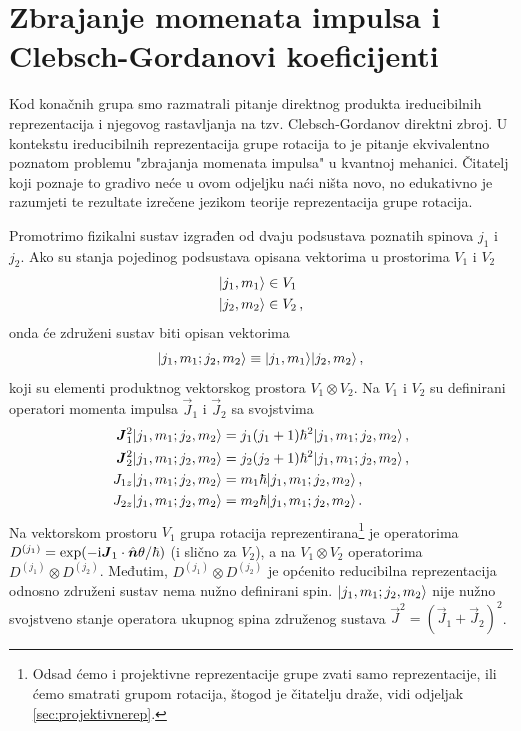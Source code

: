 \section{Zbrajanje momenata impulsa i Clebsch-Gor\-da\-no\-vi koeficijenti}
\label{sec:zbrajanjeJ}

Kod konačnih grupa smo razmatrali pitanje direktnog produkta
ireducibilnih reprezentacija i njegovog rastavljanja na tzv.
Clebsch-Gordanov direktni zbroj. U kontekstu ireducibilnih
reprezentacija grupe rotacija to je pitanje ekvivalentno
poznatom problemu "zbrajanja momenata impulsa" u kvantnoj
mehanici. Čitatelj koji poznaje to gradivo neće u ovom
odjeljku naći ništa novo, no edukativno je razumjeti te
rezultate izrečene jezikom teorije reprezentacija grupe rotacija.

Promotrimo fizikalni sustav izgrađen od dvaju podsustava poznatih
spinova $j_1$ i $j_2$. 
Ako su stanja pojedinog podsustava opisana vektorima u
prostorima $V_1$ i $V_2$
\begin{align}
| j_1, m_1 \rangle &\in V_1\\
| j_2, m_2 \rangle &\in V_2\,,
\end{align}
onda će združeni sustav biti opisan vektorima
\begin{equation}
    | j_1, m_1; j_2, m_2 \rangle \equiv| j_1, m_1 \rangle| j_2, m_2 \rangle \,,
\end{equation}
koji su elementi produktnog vektorskog prostora $V_1\otimes V_2$.
Na $V_1$ i $V_2$ su definirani operatori momenta impulsa
$\vec{J}_1$ i $\vec{J}_2$ sa svojstvima
\begin{align}
\vec{J}_{1}^2 \ket{j_1, m_1; j_2, m_2} &= j_1(j_1+1)\hbar^2 
  \ket{j_1, m_1; j_2, m_2}\,, \\
\vec{J}_{2}^2 \ket{j_1, m_1; j_2, m_2} &= j_2(j_2+1)\hbar^2 
  \ket{j_1, m_1; j_2, m_2}\,, \\
J_{1z}\ket{j_1, m_1; j_2, m_2} &= m_1 \hbar \ket{j_1, m_1; j_2, m_2}\,,\\
J_{2z}\ket{j_1, m_1; j_2, m_2} &= m_2 \hbar \ket{j_1, m_1; j_2, m_2}\,.
\end{align}
Na vektorskom
prostoru $V_1$ grupa rotacija reprezentirana\footnote{Odsad ćemo i projektivne reprezentacije
    grupe  zvati samo reprezentacije, ili ćemo  smatrati grupom rotacija,
štogod je čitatelju draže, vidi odjeljak \ref{sec:projektivnerep}.}
je operatorima $D^{(j_1)}=
\exp(-\rmi\vec{J}_1\cdot\hat{\vec{n}}\theta/\hbar)$ (i slično za $V_2$),
a na $V_1\otimes V_2$ operatorima
$D^{(j_1)}\otimes D^{(j_2)}$.
Međutim, $D^{(j_1)}\otimes D^{(j_2)}$ je općenito reducibilna reprezentacija
odnosno združeni sustav nema nužno definirani spin. 
$| j_1, m_1; j_2, m_2 \rangle$ nije nužno svojstveno
stanje operatora ukupnog spina združenog sustava $\vec{J}^2 = (\vec{J}_1 + \vec{J}_2)^2$.

